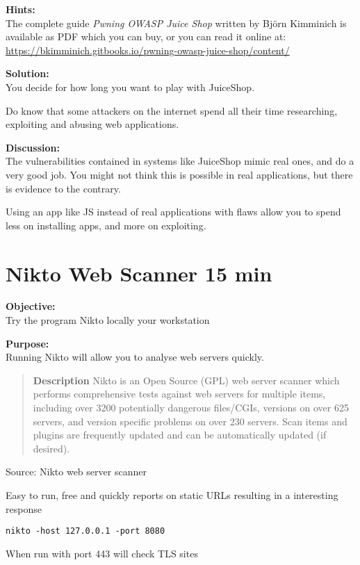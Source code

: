 \documentclass[a4paper,11pt,notitlepage]{report}
\begin{document}
 {\bf Hints:}\\
 The complete guide \emph{Pwning OWASP Juice Shop}
written by Björn Kimminich is available as PDF which you can buy, or you can read it online at:\\
\url{https://bkimminich.gitbooks.io/pwning-owasp-juice-shop/content/}

 {\bf Solution:}\\
 You decide for how long you want to play with JuiceShop.

 Do know that some attackers on the internet spend all their time researching, exploiting and abusing web applications.

 {\bf Discussion:}\\
The vulnerabilities contained in systems like JuiceShop mimic real ones, and do a very good job. You might not think this is possible in real applications, but there is evidence to the contrary.

Using an app like JS instead of real applications with flaws allow you to spend less on installing apps, and more on exploiting.




\chapter{Nikto Web Scanner 15 min}
\label{ex:nikto-webscanner}

{\bf Objective:}\\
Try the program Nikto locally your workstation


{\bf Purpose:}\\
Running Nikto will allow you to analyse web servers quickly.


\begin{quote}
{\bf Description}
Nikto is an Open Source (GPL) web server scanner which performs
comprehensive tests against web servers for multiple items, including
over 3200 potentially dangerous files/CGIs, versions on over 625
servers, and version specific problems on over 230 servers. Scan items
and plugins are frequently updated and can be automatically updated
(if desired).
\end{quote}

Source: Nikto web server scanner 


\begin{list1}
\item Easy to run, free and quickly reports on static URLs resulting in a interesting response
\item \verb+nikto -host 127.0.0.1 -port 8080+
\item When run with port 443 will check TLS sites
\end{list1}
\end{document}
